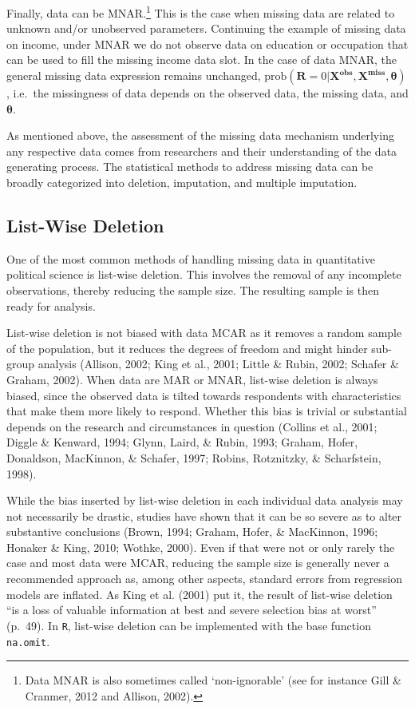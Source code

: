 \documentclass[12pt,econ]{sources/authesis}
\begin{document}
Finally, data can be MNAR.\footnote{Data MNAR is also sometimes called `non-ignorable' (see for instance Gill \& Cranmer, 2012 and Allison, 2002).} This is the case when missing data are related to unknown and/or unobserved parameters. Continuing the example of missing data on income, under MNAR we do not observe data on education or occupation that can be used to fill the missing income data slot. In the case of data MNAR, the general missing data expression remains unchanged, \(\text{prob}(\bm{R} = 0 | \bm{X^{obs}}, \bm{X^{miss}}, \bm{\theta})\), i.e.~the missingness of data depends on the observed data, the missing data, and \(\bm{\theta}\).

As mentioned above, the assessment of the missing data mechanism underlying any respective data comes from researchers and their understanding of the data generating process. The statistical methods to address missing data can be broadly categorized into deletion, imputation, and multiple imputation.

\hypertarget{ordmiss-theory-delete}{%
\subsection{List-Wise Deletion}\label{ordmiss-theory-delete}}

One of the most common methods of handling missing data in quantitative political science is list-wise deletion. This involves the removal of any incomplete observations, thereby reducing the sample size. The resulting sample is then ready for analysis.

List-wise deletion is not biased with data MCAR as it removes a random sample of the population, but it reduces the degrees of freedom and might hinder sub-group analysis (Allison, 2002; King et al., 2001; Little \& Rubin, 2002; Schafer \& Graham, 2002). When data are MAR or MNAR, list-wise deletion is always biased, since the observed data is tilted towards respondents with characteristics that make them more likely to respond. Whether this bias is trivial or substantial depends on the research and circumstances in question (Collins et al., 2001; Diggle \& Kenward, 1994; Glynn, Laird, \& Rubin, 1993; Graham, Hofer, Donaldson, MacKinnon, \& Schafer, 1997; Robins, Rotznitzky, \& Scharfstein, 1998).

While the bias inserted by list-wise deletion in each individual data analysis may not necessarily be drastic, studies have shown that it can be so severe as to alter substantive conclusions (Brown, 1994; Graham, Hofer, \& MacKinnon, 1996; Honaker \& King, 2010; Wothke, 2000). Even if that were not or only rarely the case and most data were MCAR, reducing the sample size is generally never a recommended approach as, among other aspects, standard errors from regression models are inflated. As King et al. (2001) put it, the result of list-wise deletion ``is a loss of valuable information at best and severe selection bias at worst'' (p.~49). In \texttt{R}, list-wise deletion can be implemented with the base function \texttt{na.omit}.
\end{document}
